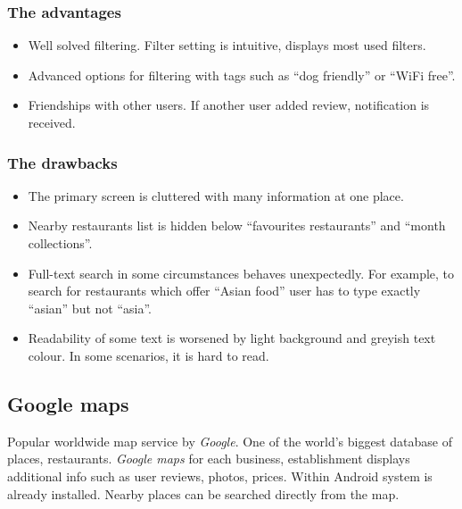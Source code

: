 \subsubsection{The advantages}
\begin{itemize}
    \item Well solved filtering. Filter setting is intuitive, displays most used filters. 
    \item Advanced options for filtering with tags such as ``dog friendly'' or ``WiFi free''.
    \item Friendships with other users. If another user added review, notification is received.
\end{itemize}

\subsubsection{The drawbacks}
\begin{itemize}
    \item The primary screen is cluttered with many information at one place.
    \item Nearby restaurants list is hidden below ``favourites restaurants'' and ``month collections''.
    \item Full-text search in some circumstances behaves unexpectedly. For example, to search for restaurants which offer ``Asian food'' user has to type exactly ``asian'' but not ``asia''.
    \item Readability of some text is worsened by light background and greyish text colour. In some scenarios, it is hard to read.
\end{itemize}

\subsection{Google maps}
Popular worldwide map service by \textit{Google}. One of the world's biggest database of places, restaurants. 
\textit{Google maps} for each business, establishment displays additional info such as user reviews, photos, prices. 
Within Android system is already installed. Nearby places can be searched directly from the map.

